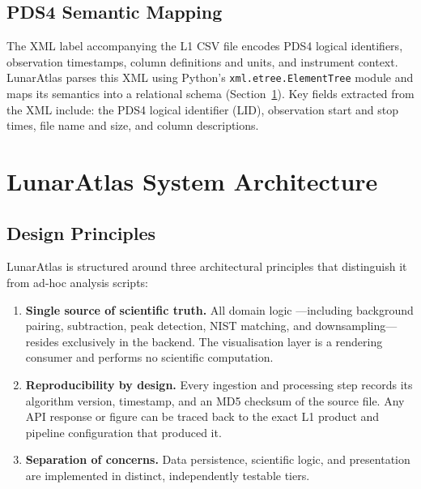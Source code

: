 \documentclass[a4paper,twocolumn,10pt]{article}
\begin{document}
\subsection{PDS4 Semantic Mapping}

The XML label accompanying the L1 CSV file encodes PDS4 logical
identifiers, observation timestamps, column definitions and units, and
instrument context.  LunarAtlas parses this XML using Python's
\texttt{xml.etree.ElementTree} module and maps its semantics into a
relational schema (Section~\ref{sec:architecture}).  Key fields
extracted from the XML include: the PDS4 logical identifier (LID),
observation start and stop times, file name and size, and column
descriptions.


\section{LunarAtlas System Architecture}
\label{sec:architecture}

\subsection{Design Principles}

LunarAtlas is structured around three architectural principles that
distinguish it from ad-hoc analysis scripts:

\begin{enumerate}[nosep,leftmargin=*]
  \item \textbf{Single source of scientific truth.}  All domain logic
    ---including background pairing, subtraction, peak detection,
    NIST matching, and downsampling---resides exclusively in the
    backend.  The visualisation layer is a rendering consumer and
    performs no scientific computation.

  \item \textbf{Reproducibility by design.}  Every ingestion and
    processing step records its algorithm version, timestamp, and an
    MD5 checksum of the source file.  Any API response or figure can
    be traced back to the exact L1 product and pipeline configuration
    that produced it.

  \item \textbf{Separation of concerns.}  Data persistence, scientific
    logic, and presentation are implemented in distinct, independently
    testable tiers.
\end{enumerate}
\end{document}
